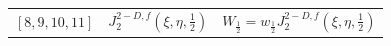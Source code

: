 \begin{spacing}{1.5}
\begin{table}[htp]
\begin{tabular}{lll}
			$[8,9,10,11]$ & $J_2^{2-D,f}(\xi,\eta,\frac{1}{2})$ & $W_\frac{1}{2}=w_\frac{1}{2} J_2^{2-D,f}(\xi,\eta,\frac{1}{2})$ 
		\end{tabular}
	\end{table}
	
\end{spacing}
	
